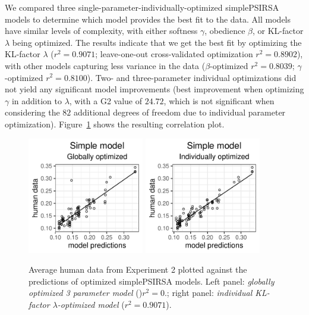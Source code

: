 \documentclass[10pt,a4paper]{article}
\begin{document}
We compared three single-parameter-individually-optimized simplePSIRSA models to determine which model provides the best fit to the data. 
All models have similar levels of complexity, with either softness $\gamma$, obedience $\beta$, or KL-factor $\lambda$ being optimized.
The results indicate that we get the best fit by optimizing the KL-factor $\lambda$ ($r^{2}=0.9071$; leave-one-out cross-validated optimization $r^{2}=0.8902$), with other models capturing less variance in the data ($\beta$-optimized $r^{2}=0.8039$; $\gamma$-optimized $r^{2}=0.8100$).
Two- and three-parameter individual optimizations did not yield any significant model improvements (best improvement when optimizing $\gamma$ in addition to $\lambda$, with a G2 value of $24.72$, which is not significant when considering the $82$ additional degrees of freedom due to individual parameter optimization).
Figure~\ref{global-individual-x3} shows the resulting correlation plot. 
 
\begin{figure}[ht]
	\centering
	\includegraphics[width=2in]{images/x3_m24.pdf}
	\includegraphics[width=2in]{images/x3_m11.pdf}
	\caption{Average human data from Experiment 2 plotted against the predictions of optimized simplePSIRSA models.
		Left panel: \emph{globally optimized 3 parameter model} ()$r^{2}=0.$;
		right panel: \emph{individual KL-factor $\lambda$-optimized model} ($r^{2}=0.9071$). }
	\label{global-individual-x3}
\end{figure}
\end{document}
